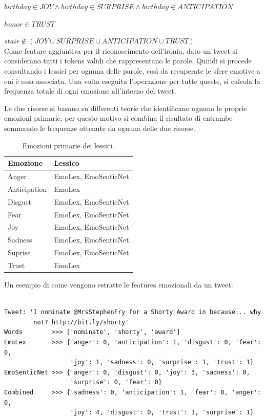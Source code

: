 \documentclass[oneside]{book}
\begin{document}
$birthday \in JOY \land birthday \in SURPRISE \land birthday \in ANTICIPATION$

$honor \in TRUST$

$ stair \notin (JOY \cup SURPRISE \cup ANTICIPATION \cup TRUST) $\\


Come feature aggiuntiva per il riconoscimento dell'ironia, dato un tweet si considerano tutti i tokens validi che rappresentano le parole. Quindi si procede consultando i lessici per ognuna delle parole, così da recuperate le sfere emotive a cui è essa associata. Una volta eseguita l'operazione per tutte queste, si calcola la frequenza totale di ogni emozione all'interno del tweet.

Le due risorse si basano su differenti teorie che identificano ognuna le proprie emozioni primarie, per questo motivo si combina il risultato di entrambe sommando le frequenze ottenute da ognuna delle due risorse.

\begin{table}[h!]
	\centering
	\begin{tabular}[t]{l|l}
		\hline
		\textbf{Emozione} & \textbf{Lessico} \\
		\hline
		Anger			& EmoLex, EmoSenticNet \\
		Anticipation	& EmoLex \\
		Disgust			& EmoLex, EmoSenticNet \\
		Fear			& EmoLex, EmoSenticNet \\
		Joy				& EmoLex, EmoSenticNet \\
		Sadness			& EmoLex, EmoSenticNet \\
		Suprise			& EmoLex, EmoSenticNet \\
		Trust			& EmoLex \\
		\hline
	\end{tabular}
	\caption{Emozioni primarie dei lessici.}
\end{table}


Un esempio di come vengono estratte le features emozionali da un tweet:

\begin{lstlisting}[caption={Esempio di estrazione delle emozioni da un tweet.}]

Tweet: 'I nominate @MrsStephenFry for a Shorty Award in because... why
        not? http://bit.ly/shorty'
Words	     >>> ['nominate', 'shorty', 'award']
EmoLex       >>> {'anger': 0, 'anticipation': 1, 'disgust': 0, 'fear': 0,
                  'joy': 1, 'sadness': 0, 'surprise': 1, 'trust': 1}
EmoSenticNet >>> {'anger': 0, 'disgust': 0, 'joy': 3, 'sadness': 0,
                  'surprise': 0, 'fear': 0}
Combined     >>> {'sadness': 0, 'anticipation': 1, 'fear': 0, 'anger': 0,
                  'joy': 4, 'disgust': 0, 'trust': 1, 'surprise': 1}
\end{lstlisting}
\end{document}
